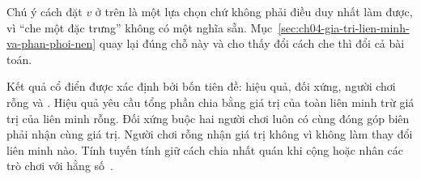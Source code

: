 Chú ý cách đặt $v$ ở trên là một lựa chọn chứ không phải điều duy nhất làm
được, vì \enquote{che một đặc trưng} không có một nghĩa sẵn.
Mục~\ref{sec:ch04-gia-tri-lien-minh-va-phan-phoi-nen} quay lại đúng chỗ này và
cho thấy đổi cách che thì đổi cả bài toán.

%
Kết quả cổ điển được xác định bởi bốn tiên đề: hiệu quả, đối xứng, người
chơi rỗng và . Hiệu quả yêu cầu tổng phần chia bằng giá trị của
toàn liên minh trừ giá trị của liên minh rỗng. Đối xứng buộc hai người chơi
luôn có cùng đóng góp biên phải nhận cùng giá trị. Người chơi rỗng nhận giá
trị không vì không làm thay đổi liên minh nào. Tính tuyến tính giữ cách chia
nhất quán khi cộng hoặc nhân các trò chơi với hằng số~\autocite{p19shapinference}.
